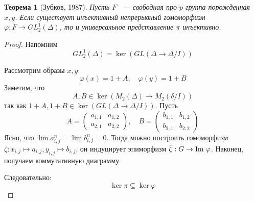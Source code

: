 \documentclass[12pt,a4paper]{article}
\newtheorem{theorem}{Теорема}[section]
\begin{document}
    \vskip 0.1in\noindent
    \begin{theorem}[Зубков, 1987]
        Пусть $F$ ~--- свободная про-$p$ группа порожденная $x, y$.
        Если существует инъективный непрерывный гомоморфизм $\varphi: F \to GL^1_2(\Delta)$, то и универсальное представление $\pi$ инъективно.
    \end{theorem}
    \begin{proof}
        Напомним
        \[
            GL^1_2(\Delta) = \ker{(GL(\Delta \to \Delta / I))}
        \]

        Рассмотрим образы $x, y$:
        \[
            \varphi(x) = 1 + A, \quad
            \varphi(y) = 1 + B
        \]
        Заметим, что
        \[
            A, B \in \ker{(M_2(\Delta)\to M_2(\delta/I))}
        \]
        так как $1 + A, 1 + B \in \ker{(GL(\Delta \to \Delta / I))}$.
        Пусть
        \[
            A=
            \begin{pmatrix}
                a_{1,1} & a_{1,2} \\
                a_{2,1} & a_{2,2}
            \end{pmatrix},
            \quad
            B=
            \begin{pmatrix}
                b_{1,1} & b_{1,2} \\
                b_{2,1} & b_{2,2}
            \end{pmatrix}
        \]
        Ясно, что $\lim a_{i,j}^n = \lim b_{i,j}^n = 0$.
        Тогда можно построить гомоморфизм $\zeta: x_{i,j} \mapsto a_{i,j}, y_{i,j} \mapsto b_{i,j}$, он индуцирует эпиморфизм
        $\hat{\zeta}: G \to \mathrm{Im}\hspace{0.1cm}{\varphi}$.
        Наконец, получаем коммутативную диаграмму
        \begin{center}
        \end{center}
        Следовательно:
        \[
            \ker{\pi} \subseteq \ker{\varphi}
        \]

    \end{proof}
\end{document}
